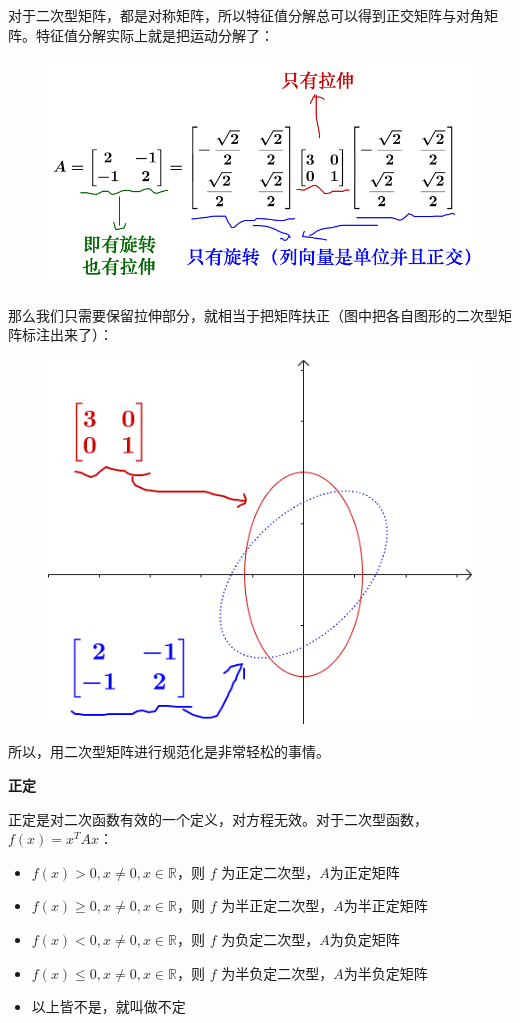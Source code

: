\documentclass[12pt]{article}
\begin{document}
对于二次型矩阵，都是对称矩阵，所以特征值分解总可以得到正交矩阵与对角矩阵。特征值分解实际上就是把运动分解了：
\begin{figure}[H]
    \centering
    \includegraphics[width=.8\textwidth]{fig/UnderstandQuadraticForm_9.png}
\end{figure} 

那么我们只需要保留拉伸部分，就相当于把矩阵扶正（图中把各自图形的二次型矩阵标注出来了）：
\begin{figure}[H]
    \centering
    \includegraphics[width=.5\textwidth]{fig/UnderstandQuadraticForm_10.png}
\end{figure} 

所以，用二次型矩阵进行规范化是非常轻松的事情。

\textbf{正定}

正定是对二次函数有效的一个定义，对方程无效。对于二次型函数，$f(x)=x^TAx$：
\begin{itemize}
    \item $f(x)>0, x \ne 0, x \in \mathbb{R}$，则 $f$ 为正定二次型，$A$为正定矩阵
    \item $f(x) \ge 0, x \ne 0, x \in \mathbb{R}$，则 $f$ 为半正定二次型，$A$为半正定矩阵
    \item $f(x) < 0, x \ne 0, x \in \mathbb{R}$，则 $f$ 为负定二次型，$A$为负定矩阵
    \item $f(x) \le 0, x \ne 0, x \in \mathbb{R}$，则 $f$ 为半负定二次型，$A$为半负定矩阵
    \item 以上皆不是，就叫做不定
\end{itemize}
\end{document}
